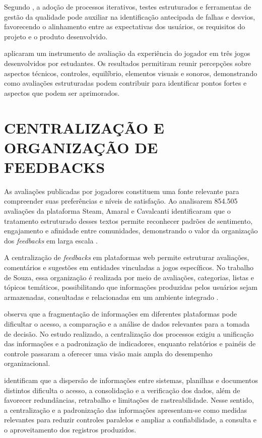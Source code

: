Segundo , a adoção de processos iterativos, testes estruturados e ferramentas de gestão da qualidade pode auxiliar na identificação antecipada de falhas e desvios, favorecendo o alinhamento entre as expectativas dos usuários, os requisitos do projeto e o produto desenvolvido.

 aplicaram um instrumento de avaliação da experiência do jogador em três jogos desenvolvidos por estudantes. Os resultados permitiram reunir percepções sobre aspectos técnicos, controles, equilíbrio, elementos visuais e sonoros, demonstrando como avaliações estruturadas podem contribuir para identificar pontos fortes e aspectos que podem ser aprimorados.

\section{CENTRALIZAÇÃO E ORGANIZAÇÃO DE FEEDBACKS}

As avaliações publicadas por jogadores constituem uma fonte relevante para compreender suas preferências e níveis de satisfação. Ao analisarem 854.505 avaliações da plataforma Steam, Amaral e Cavalcanti identificaram que o tratamento estruturado desses textos permite reconhecer padrões de sentimento, engajamento e afinidade entre comunidades, demonstrando o valor da organização dos \textit{feedbacks} em larga escala \cite{amaral2024desvendando}.

A centralização de \textit{feedbacks} em plataformas web permite estruturar avaliações, comentários e sugestões em entidades vinculadas a jogos específicos. No trabalho de Souza, essa organização é realizada por meio de avaliações, categorias, listas e tópicos temáticos, possibilitando que informações produzidas pelos usuários sejam armazenadas, consultadas e relacionadas em um ambiente integrado \cite{souza2024ludus}.

 observa que a fragmentação de informações em diferentes plataformas pode dificultar o acesso, a comparação e a análise de dados relevantes para a tomada de decisão. No estudo realizado, a centralização dos processos exigiu a unificação das informações e a padronização de indicadores, enquanto relatórios e painéis de controle passaram a oferecer uma visão mais ampla do desempenho organizacional.

 identificam que a dispersão de informações entre sistemas, planilhas e documentos distintos dificulta o acesso, a consolidação e a verificação dos dados, além de favorecer redundâncias, retrabalho e limitações de rastreabilidade. Nesse sentido, a centralização e a padronização das informações apresentam-se como medidas relevantes para reduzir controles paralelos e ampliar a confiabilidade, a consulta e o aproveitamento dos registros produzidos.

